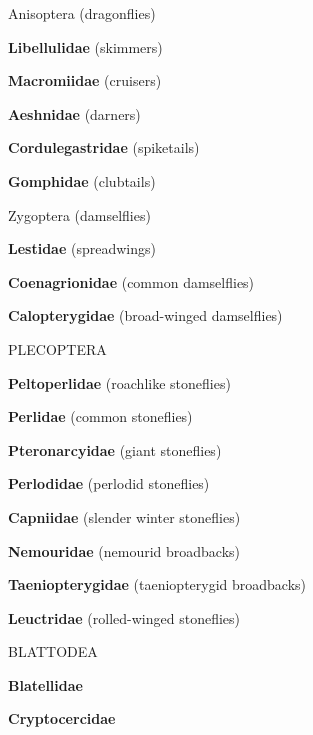 \documentclass[letterpaper,10pt]{article}
\begin{document}
{\makebox[0.20cm]{}  Anisoptera (dragonflies) \par
\makebox[0.6cm]{}  \textbf{Libellulidae} (skimmers) \par
\makebox[0.6cm]{}  \textbf{Macromiidae} (cruisers) \par
\makebox[0.6cm]{}  \textbf{Aeshnidae} (darners) \par
\makebox[0.6cm]{}  \textbf{Cordulegastridae} (spiketails) \par
\makebox[0.6cm]{}  \textbf{Gomphidae} (clubtails) \par

\makebox[0.20cm]{}  Zygoptera (damselflies) \par
\makebox[0.6cm]{}  \textbf{Lestidae} (spreadwings) \par
\makebox[0.6cm]{}  \textbf{Coenagrionidae} (common damselflies) \par
\makebox[0.6cm]{}  \textbf{Calopterygidae} (broad-winged damselflies) \par
%
%
%
\makebox[0.0cm]{}  PLECOPTERA  \par
\makebox[0.6cm]{}  \textbf{Peltoperlidae} (roachlike stoneflies) \par
\makebox[0.6cm]{}  \textbf{Perlidae} (common stoneflies) \par
\makebox[0.6cm]{}  \textbf{Pteronarcyidae} (giant stoneflies) \par
\makebox[0.6cm]{}  \textbf{Perlodidae} (perlodid stoneflies) \par
\makebox[0.6cm]{}  \textbf{Capniidae} (slender winter stoneflies) \par
\makebox[0.6cm]{}  \textbf{Nemouridae} (nemourid broadbacks) \par
\makebox[0.6cm]{}  \textbf{Taeniopterygidae} (taeniopterygid broadbacks) \par
\makebox[0.6cm]{}  \textbf{Leuctridae} (rolled-winged stoneflies) \par
%
%
%
\makebox[0.0cm]{}  BLATTODEA \par
\makebox[0.6cm]{}  \textbf{Blatellidae} \par
\makebox[0.6cm]{}  \textbf{Cryptocercidae} \par
}
\end{document}
